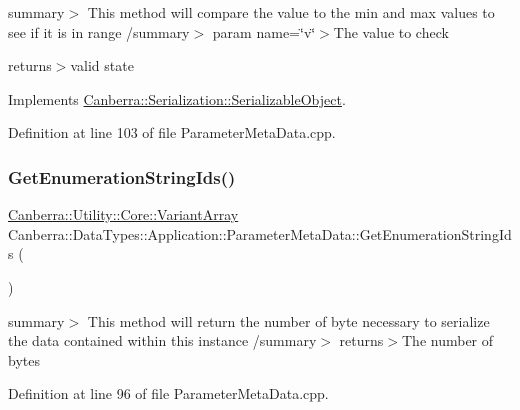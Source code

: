 summary$>$ This method will compare the value to the min and max values to see if it is in range /summary$>$ param name=\char`\"{}v\char`\"{}$>$The value to check

returns$>$valid state

Implements \hyperlink{class_canberra_1_1_serialization_1_1_serializable_object}{Canberra\+::\+Serialization\+::\+Serializable\+Object}.



Definition at line 103 of file Parameter\+Meta\+Data.\+cpp.

\mbox{\label{class_canberra_1_1_data_types_1_1_application_1_1_parameter_meta_data_a198edfcffe6166c562ce5c8f89e425c3_a198edfcffe6166c562ce5c8f89e425c3}} 
\subsubsection{\texorpdfstring{Get\+Enumeration\+String\+Ids()}{GetEnumerationStringIds()}}
{\footnotesize\ttfamily \hyperlink{class_canberra_1_1_utility_1_1_core_1_1_variant_array}{Canberra\+::\+Utility\+::\+Core\+::\+Variant\+Array} Canberra\+::\+Data\+Types\+::\+Application\+::\+Parameter\+Meta\+Data\+::\+Get\+Enumeration\+String\+Ids (\begin{DoxyParamCaption}{ }\end{DoxyParamCaption})}

summary$>$ This method will return the number of byte necessary to serialize the data contained within this instance /summary$>$ returns$>$The number of bytes

Definition at line 96 of file Parameter\+Meta\+Data.\+cpp.

\mbox{\label{class_canberra_1_1_data_types_1_1_application_1_1_parameter_meta_data_a30546e9ea2bf6b6253dffa837279ed00_a30546e9ea2bf6b6253dffa837279ed00}} 
